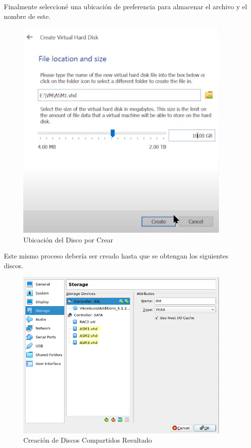 \documentclass{article}
\begin{document}
Finalmente seleccioné una ubicación de preferencia para almacenar el archivo y el nombre de este.

\begin{figure}[H]
		\begin{center}
			\includegraphics[width=0.95\textwidth]{vm_shared_disk_creation_location.png}
		\end{center}
		\caption{Ubicación del Disco por Crear}
\end{figure}

Este mismo proceso debería ser creado hasta que se obtengan los siguientes discos.

\begin{figure}[H]
		\begin{center}
			\includegraphics[width=0.95\textwidth]{vm_shared_disk_result.png}
		\end{center}
		\caption{Creación de Discos Compartidos Resultado}
\end{figure}
\end{document}
